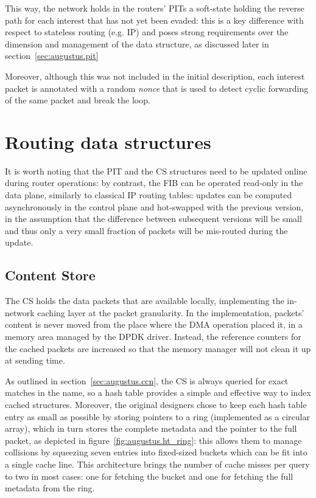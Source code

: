 \documentclass[12pt,a4paper,twoside]{book}
\begin{document}
This way, the network holds in the routers' \gls{PIT}s a soft-state holding the reverse path for each interest that has not yet been evaded: this is a key difference with respect to stateless routing (e.g. IP) and poses strong requirements over the dimension and management of the data structure, as discussed later in section~\ref{sec:augustus.pit}

Moreover, although this was not included in the initial description, each interest packet is annotated with a random \textit{nonce} that is used to detect cyclic forwarding of the same packet and break the loop.


\section{Routing data structures}\label{sec:augustus.structures}

It is worth noting that the \gls{PIT} and the \gls{CS} structures need to be updated online during router operations: by contrast, the \gls{FIB} can be operated read-only in the data plane, similarly to classical IP routing tables: updates can be computed asynchronously in the control plane and hot-swapped with the previous version, in the assumption that the difference between subsequent versions will be small and thus only a very small fraction of packets will be mis-routed during the update.

\subsection{Content Store}\label{sec:augustus.cs}
The \gls{CS} holds the data packets that are available locally, implementing the in-network caching layer at the packet granularity. In the implementation, packets' content is never moved from the place where the \gls{DMA} operation placed it, in a memory area managed by the DPDK driver. Instead, the reference counters for the cached packets are increased so that the memory manager will not clean it up at sending time.

As outlined in section~\ref{sec:augustus.ccn}, the CS is always queried for exact matches in the name, so a hash table provides a simple and effective way to index cached structures. Moreover, the original designers chose to keep each hash table entry as small as possible by storing pointers to a ring (implemented as a circular array), which in turn stores the complete metadata and the pointer to the full packet, as depicted in figure~\ref{fig:augustus.ht_ring}: this allows them to manage collisions by squeezing seven entries into fixed-sized buckets which can be fit into a single cache line. This architecture brings the number of cache misses per query to two in most cases: one for fetching the bucket and one for fetching the full metadata from the ring.
\end{document}
